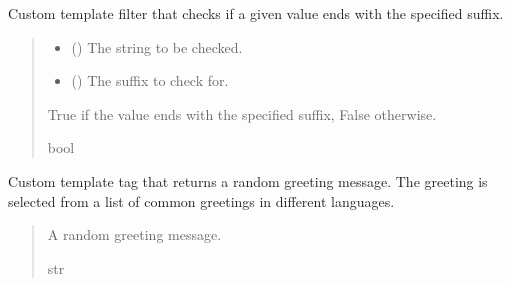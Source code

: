 \documentclass[letterpaper,10pt,english]{sphinxmanual}
\begin{document}
\begin{fulllineitems}
\label{\detokenize{modules/others:account.templatetags.custom_filters.ends_with}}
\pysigstartsignatures
{}
\pysigstopsignatures
\sphinxAtStartPar
Custom template filter that checks if a given value ends with the specified suffix.
\begin{quote}\begin{description}
\begin{itemize}
\item {} 
\sphinxAtStartPar
{} () \textendash{} The string to be checked.

\item {} 
\sphinxAtStartPar
{} () \textendash{} The suffix to check for.

\end{itemize}

\sphinxAtStartPar
True if the value ends with the specified suffix, False otherwise.

\sphinxAtStartPar
bool

\end{description}\end{quote}

\end{fulllineitems}


\begin{fulllineitems}
\label{\detokenize{modules/others:account.templatetags.custom_filters.random_greeting}}
\pysigstartsignatures
{}
\pysigstopsignatures
\sphinxAtStartPar
Custom template tag that returns a random greeting message. The greeting is selected from
a list of common greetings in different languages.
\begin{quote}\begin{description}
\sphinxAtStartPar
A random greeting message.

\sphinxAtStartPar
str

\end{description}\end{quote}

\end{fulllineitems}
\end{document}
